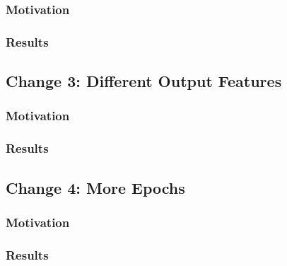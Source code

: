 \documentclass{article}
\begin{document}
    \subsubsection{Motivation}

    \subsubsection{Results}

    \subsection{Change 3: Different Output Features}

    \subsubsection{Motivation}

    \subsubsection{Results}

    \subsection{Change 4: More Epochs}

    \subsubsection{Motivation}

    \subsubsection{Results}

    
\end{document}
